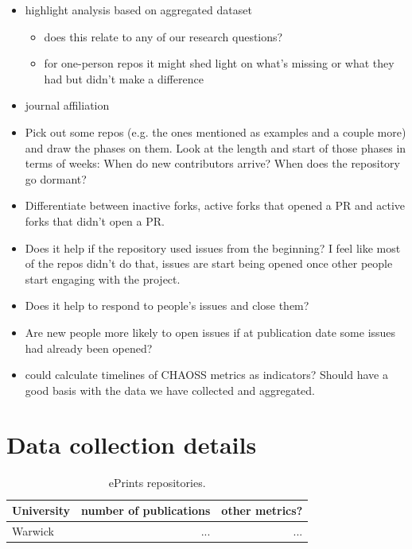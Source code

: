 \documentclass[10pt,a4paper]{scrartcl}
\begin{document}
\begin{itemize}
    \item highlight analysis based on aggregated dataset
    \begin{itemize}
        \item does this relate to any of our research questions?
        \item for one-person repos it might shed light on what's missing or what they had but didn't make a difference
    \end{itemize}
    \item journal affiliation
    \item Pick out some repos (e.g. the ones mentioned as examples and a couple more) and draw the phases on them. Look at the length and start of those phases in terms of weeks: When do new contributors arrive? When does the repository go dormant?
    \item Differentiate between inactive forks, active forks that opened a PR and active forks that didn't open a PR.
    \item Does it help if the repository used issues from the beginning? I feel like most of the repos didn't do that, issues are start being opened once other people start engaging with the project.
    \item Does it help to respond to people's issues and close them?
    \item Are new people more likely to open issues if at publication date some issues had already been opened?
    \item could calculate timelines of CHAOSS metrics as indicators? Should have a good basis with the data we have collected and aggregated.
\end{itemize}

%
%

\appendix

\section{Data collection details}

\begin{table}[h]
    \centering
    \begin{tabular}{|l|r|r|}
        \hline
        University & number of publications & other metrics? \\
        \hline
        Warwick & ... & ...\\
        \hline
    \end{tabular}
    \caption{ePrints repositories.}
    \label{table:eprints}
\end{table}
\end{document}
